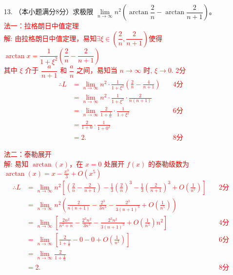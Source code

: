 \documentclass[a4paper,12pt]{article}
\begin{document}
\begin{enumerate}
    \item[13.]（本小题满分8分）求极限 \( \underset{n \to \infty}{\lim} n^2 \left( \arctan \dfrac{2}{n} - \arctan \dfrac{2}{n+1} \right) \)。\\
    \textcolor{red}{
    法一：拉格朗日中值定理\\[0.5em]
    解: 由拉格朗日中值定理，易知$\exists \xi \in (\dfrac{2}{n},\dfrac{2}{n+1})$使得$\arctan{x}=\dfrac{1}{1 + \xi^2} \left( \dfrac{2}{n} - \dfrac{2}{n+1} \right)$\\[0.5em]
    其中 $\xi$ 介于 $\dfrac{a}{n+1}$ 和 $\dfrac{a}{n}$ 之间，易知当 $n \to \infty$ 时, $\xi \to 0$.  \qquad\qquad 2分
    \begin{align*}
    \therefore L
    &= \lim_{n \to \infty} n^2 \cdot \frac{1}{1 + \xi^2} \left( \frac{2}{n} - \frac{4}{n+1} \right)   \quad & \text{4分}\\
    &= \lim_{n \to \infty} n^2 \cdot \frac{1}{1 + \xi^2} \cdot \frac{2}{n(n+1)} \\
    &= \lim_{n \to \infty} \frac{2}{1 + \frac{1}{n}} \cdot \frac{1}{1 + \xi^2} \quad & \text{6分}\\
    &= \frac{2}{1 + 0} \cdot \frac{1}{1 + 0^2} \\
    &= 2.  \quad & \text{8分}
    \end{align*}
    }

    \textcolor{red}{
    法二：泰勒展开\\[0.5em]
    解: 易知 $\arctan(x)$，在 $x = 0$ 处展开 $f(x)$ 的泰勒级数为$\arctan(x) = x - \frac{x^3}{3} + O(x^5)$
    \begin{align*}
    \therefore L 
    &= \lim_{n \to \infty} n^2 \left[\left( \frac{2}{n} - \frac{2}{n+1} \right) - \frac{1}{3} \left( \frac{2}{n} \right)^3- \frac{1}{3}\left( \frac{2}{n+1} \right)^3 + O\left( \frac{1}{n^5} \right) \right]   \quad & \text{2分} \\
    &= \lim_{n \to \infty} n^2 \left( \frac{2}{n(n+1)} - \frac{2^3}{3n^3} - \frac{2^3}{3(n+1)^3} + O\left( \frac{1}{n^5} \right) \right) \\
    &= \lim_{n \to \infty} \left[ \frac{2n^2}{n^2+n} - \frac{2^3n^2}{3n^3} - \frac{2^3n^2}{3(n+1)^3} + O\left( \frac{1}{n^5} \right)n^2 \right]   \quad & \text{4分}\\
    &= \lim_{n \to \infty} \left[ \frac{2}{1 + \frac{1}{n}} - 0 - 0 + O\left( \frac{1}{n^3} \right) \right]   \quad & \text{6分}\\
    &= \lim_{n \to \infty} \frac{2}{1 + \frac{1}{n}} \\
    &= 2. \quad & \text{8分}
    \end{align*}
    }


\end{enumerate}
\end{document}

